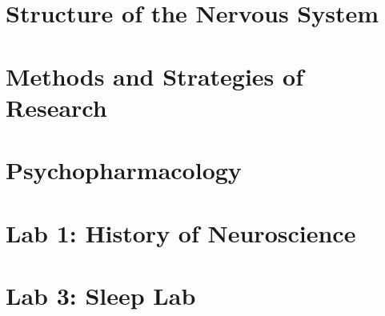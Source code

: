 \documentclass[12pt, oneside]{book}
\begin{document}
\setcounter{chapter}{2}
\chapter{Structure of the Nervous System}
\vspace*{-0.25in}


\setcounter{chapter}{4}
\chapter{Methods and Strategies of Research}
\vspace*{-0.25in}


% 

\setcounter{chapter}{6}
\chapter{Psychopharmacology}
\vspace*{-0.25in}



\chapter{Lab 1: History of Neuroscience}
\vspace{-0.25in}


% 

\chapter{Lab 3: Sleep Lab}
\vspace*{-0.25in}

\end{document}
